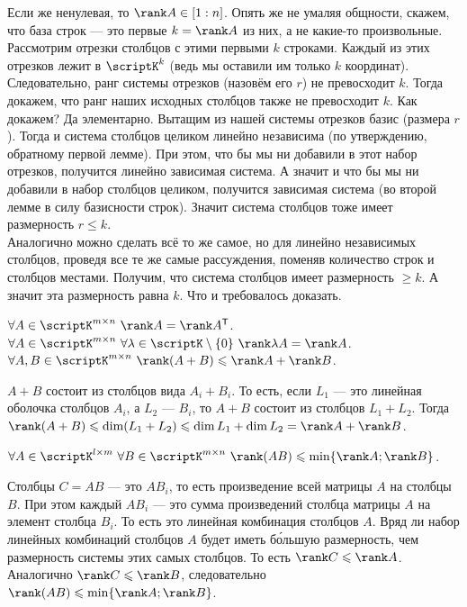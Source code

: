 \documentclass{article}
\newcommand*{\trans}{^{\mathsf T}}
\begin{document}
\begin{itemize}
\begin{Proof}
            Если же ненулевая, то $\rank A\in[1:n]$. Опять же не умаляя общности, скажем, что база строк --- это первые $k=\rank A$ из них, а не какие-то произвольные. Рассмотрим отрезки столбцов с этими первыми $k$ строками. Каждый из этих отрезков лежит в $\scriptK^k$ (ведь мы оставили им только $k$ координат). Следовательно, ранг системы отрезков (назовём его $r$) не превосходит $k$. Тогда докажем, что ранг наших исходных столбцов также не превосходит $k$. Как докажем? Да элементарно. Вытащим из нашей системы отрезков базис (размера $r$). Тогда и система столбцов целиком линейно независима (по утверждению, обратному первой лемме). При этом, что бы мы ни добавили в этот набор отрезков, получится линейно зависимая система. А значит и что бы мы ни добавили в набор столбцов целиком, получится зависимая система (во второй лемме в силу базисности строк). Значит система столбцов тоже имеет размерность $r\leqslant k$.\\
            Аналогично можно сделать всё то же самое, но для линейно независимых столбцов, проведя все те же самые рассуждения, поменяв количество строк и столбцов местами. Получим, что система столбцов имеет размерность $\geqslant k$. А значит эта размерность равна $k$. Что и требовалось доказать.
        \end{Proof}
        \thm $\forall A\in\scriptK^{m\times n}~\rank A=\rank A\trans$.
        \thm $\forall A\in\scriptK^{m\times n}~\forall\lambda\in\scriptK\setminus\{0\}~\rank\lambda A=\rank A$.
        \thm $\forall A,B\in\scriptK^{m\times n}~\rank(A+B)\leqslant\rank A+\rank B$.
        \begin{Proof}
            $A+B$ состоит из столбцов вида $A_i+B_i$. То есть, если $L_1$ --- это линейная оболочка столбцов $A_i$, а $L_2$ --- $B_i$, то $A+B$ состоит из столбцов $L_1+L_2$. Тогда $\rank(A+B)\leqslant\dim(L_1+L_2)\leqslant\dim L_1+\dim L_2=\rank A+\rank B$.
        \end{Proof}
        \thm $\forall A\in\scriptK^{l\times m}~\forall B\in\scriptK^{m\times n}~\rank(AB)\leqslant\min\{\rank A;\rank B\}$.
        \begin{Proof}
            Столбцы $C=AB$ --- это $AB_i$, то есть произведение всей матрицы $A$ на столбцы $B$. При этом каждый $AB_i$ --- это сумма произведений столбца матрицы $A$ на элемент столбца $B_i$. То есть это линейная комбинация столбцов $A$. Вряд ли набор линейных комбинаций столбцов $A$ будет иметь б\'{о}льшую размерность, чем размерность системы этих самых столбцов. То есть $\rank C\leqslant\rank A$. Аналогично $\rank C\leqslant\rank B$, следовательно $\rank(AB)\leqslant\min\{\rank A;\rank B\}$.

\end{Proof}
\end{itemize}
\end{document}
